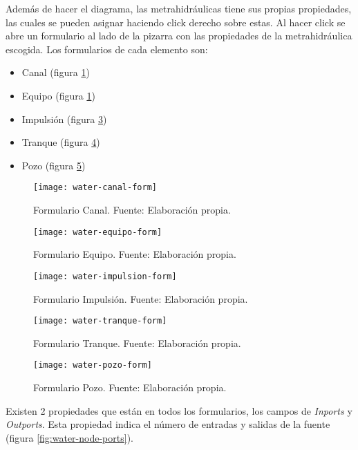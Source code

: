 Además de hacer el diagrama, las metrahidráulicas tiene sus propias propiedades, las cuales se pueden asignar haciendo click derecho sobre estas. Al hacer click se abre un formulario al lado de la pizarra con las propiedades de la metrahidráulica escogida.
Los formularios de cada elemento son:
\begin{itemize}
    \item Canal (figura \ref{fig:water-canal-form})
    \item Equipo (figura \ref{fig:water-canal-form})
    \item Impulsión (figura \ref{fig:water-impulsion-form})
    \item Tranque (figura \ref{fig:water-tranque-form})
    \item Pozo (figura \ref{fig:water-pozo-form})
\end{itemize}

\begin{figure}[H]
	\centering
	\texttt{[image: water-canal-form]}
	\caption{\label{fig:water-canal-form} Formulario Canal. Fuente: Elaboración propia.}
\end{figure}

\begin{figure}[H]
	\centering
	\texttt{[image: water-equipo-form]}
	\caption{\label{fig:water-Equipo-form} Formulario Equipo. Fuente: Elaboración propia.}
\end{figure}

\begin{figure}[H]
	\centering
	\texttt{[image: water-impulsion-form]}
	\caption{\label{fig:water-impulsion-form} Formulario Impulsión. Fuente: Elaboración propia.}
\end{figure}

\begin{figure}[H]
	\centering
	\texttt{[image: water-tranque-form]}
	\caption{\label{fig:water-tranque-form} Formulario Tranque. Fuente: Elaboración propia.}
\end{figure}

\begin{figure}[H]
	\centering
	\texttt{[image: water-pozo-form]}
	\caption{\label{fig:water-pozo-form} Formulario Pozo. Fuente: Elaboración propia.}
\end{figure}

Existen 2 propiedades que están en todos los formularios, los campos de \textit{Inports} y \textit{Outports}. Esta propiedad indica el número de entradas y salidas de la fuente (figura \ref{fig:water-node-ports}).

